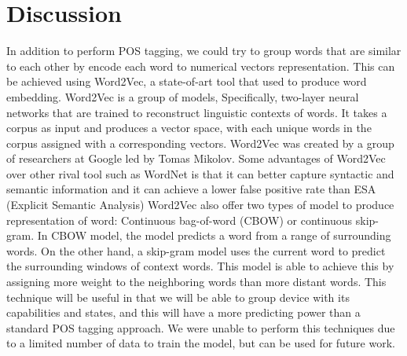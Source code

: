 \section{Discussion}
\label{sec:discussion}

In addition to perform POS tagging, we could try to group words that are similar to each other by encode each word to numerical vectors representation. This can be achieved using Word2Vec, a state-of-art tool that used to produce word embedding. Word2Vec is a group of models, Specifically, two-layer neural networks that are trained to reconstruct linguistic contexts of words. It takes a corpus as input and produces a vector space, with each unique words in the corpus assigned with a corresponding vectors.
Word2Vec was created by a group of researchers at Google led by Tomas Mikolov. Some advantages of Word2Vec over other rival tool such as WordNet is that it can better capture syntactic and semantic information and it can achieve a lower false positive rate than ESA (Explicit Semantic Analysis)  Word2Vec also offer two types of model to produce representation of word: Continuous bag-of-word (CBOW) or continuous skip-gram. In CBOW model, the model predicts a word from a range of surrounding words. On the other hand, a skip-gram model uses the current word to predict the surrounding windows of context words. This model is able to achieve this by assigning more weight to the neighboring words than more distant words.
This technique will be useful in that we will be able to group device with its capabilities and states, and this will have a more predicting power than a standard POS tagging approach.
We were unable to perform this techniques due to a limited number of data to train the model, but can be used for future work.
